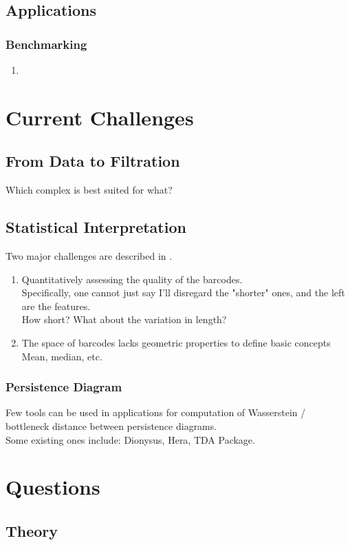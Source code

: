 \documentclass[10pt,a4paper]{article}
\begin{document}
\subsection{Applications}
\subsubsection{Benchmarking}
\begin{enumerate}
	\item 
\end{enumerate}

\section{Current Challenges}
\subsection{From Data to Filtration}
Which complex is best suited for what?
\subsection{Statistical Interpretation}
Two major challenges are described in \cite{Otter2017}.
\begin{enumerate}
	\item Quantitatively assessing the quality of the barcodes.\\
		  Specifically, one cannot just say I'll disregard the "shorter" ones, and the left are the features.\\
		  How short? What about the variation in length?\\
	\item The space of barcodes lacks geometric properties to define basic concepts\\
		  Mean, median, etc.
\end{enumerate}
\subsubsection{Persistence Diagram}
Few tools can be used in applications for computation of Wasserstein / bottleneck distance between persistence diagrams.\\
Some existing ones include: Dionysus, Hera, TDA Package.
\section{Questions}
\subsection{Theory}
\end{document}
